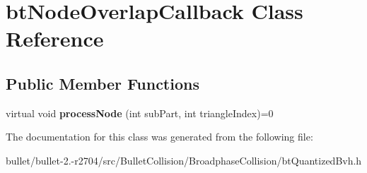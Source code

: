 \hypertarget{classbt_node_overlap_callback}{\section{bt\+Node\+Overlap\+Callback Class Reference}
\label{classbt_node_overlap_callback}
}
\subsection*{Public Member Functions}
\begin{DoxyCompactItemize}
\item 
\hypertarget{classbt_node_overlap_callback_aaad327d468e3ce197c133367ec15baf1}{virtual void {\bfseries process\+Node} (int sub\+Part, int triangle\+Index)=0}\label{classbt_node_overlap_callback_aaad327d468e3ce197c133367ec15baf1}

\end{DoxyCompactItemize}


The documentation for this class was generated from the following file\+:\begin{DoxyCompactItemize}
\item 
bullet/bullet-\/2.-\/r2704/src/\+Bullet\+Collision/\+Broadphase\+Collision/bt\+Quantized\+Bvh.\+h\end{DoxyCompactItemize}
